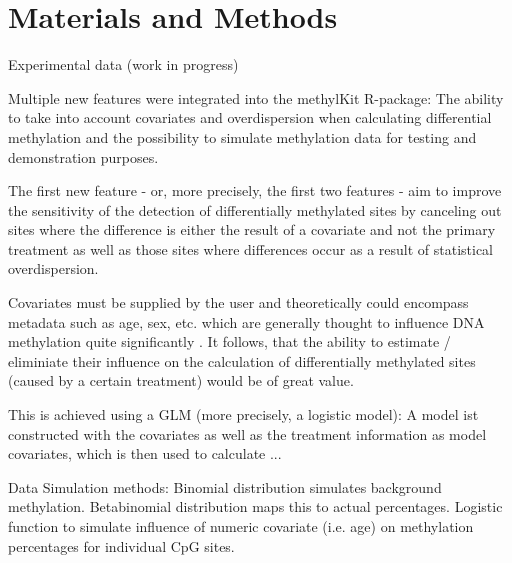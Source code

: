 \section{Materials and Methods}

Experimental data (work in progress)

Multiple new features were integrated into the methylKit R-package: The ability to take into account covariates and overdispersion when calculating differential methylation and the possibility to simulate methylation data for testing and demonstration purposes.

The first new feature - or, more precisely, the first two features - aim to  improve the sensitivity of the detection of differentially methylated sites by canceling out sites where the difference is either the result of a covariate and not the primary treatment as well as those sites where differences occur as a result of statistical overdispersion.

Covariates must be supplied by the user and theoretically could encompass metadata such as age, sex, etc. which are generally thought to influence DNA methylation quite significantly \cite{24561809}. It follows, that the ability to estimate / eliminiate their influence on the calculation of differentially methylated sites (caused by a certain treatment) would be of great value.

This is achieved using a GLM (more precisely, a logistic model): A model ist constructed with the covariates as well as the treatment information as model covariates, which is then used to calculate ...



Data Simulation methods: Binomial distribution simulates background methylation. 
Betabinomial distribution maps this to actual percentages.
Logistic function to simulate influence of numeric covariate (i.e. age) on methylation percentages for individual CpG sites.
  
  
  
  
  
  